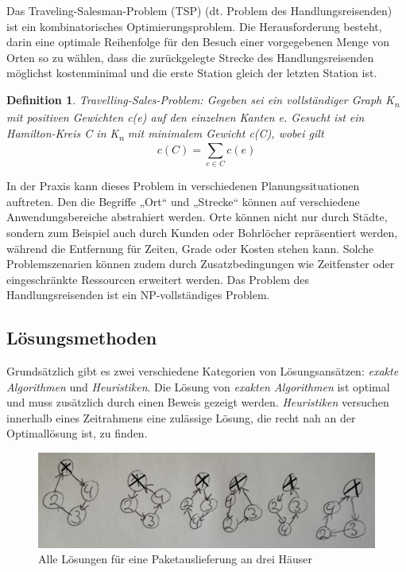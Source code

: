 \documentclass{article}
\newtheorem{mydef}{Definition}
\begin{document}
Das Traveling-Salesman-Problem (TSP) (dt. Problem des Handlungsreisenden) ist ein kombinatorisches Optimierungsproblem. Die Herausforderung besteht, darin eine optimale Reihenfolge für den Besuch einer vorgegebenen Menge von Orten so zu wählen, dass die zurückgelegte Strecke des Handlungsreisenden möglichst kostenminimal und die erste Station gleich der letzten Station ist.

\begin{mydef}
Travelling-Sales-Problem: Gegeben sei ein vollständiger Graph K\textsubscript{n} mit positiven Gewichten \textit{c(e)} auf den einzelnen Kanten  \textit{e}. Gesucht ist ein Hamilton-Kreis \textit{C} in K\textsubscript{n} mit minimalem Gewicht c(C), wobei gilt
\[c(C) =  \sum_{e \in C}  c(e) \]
\end{mydef}

In der Praxis kann dieses Problem in verschiedenen Planungssituationen auftreten. Den die Begriffe „Ort“ und „Strecke“ können auf verschiedene Anwendungsbereiche abstrahiert werden. Orte können nicht nur durch Städte, sondern zum Beispiel auch durch Kunden oder Bohrlöcher repräsentiert werden, während die Entfernung für Zeiten, Grade oder Kosten stehen kann. Solche Problemszenarien können zudem durch Zusatzbedingungen wie Zeitfenster oder eingeschränkte Ressourcen erweitert werden. Das Problem des Handlungsreisenden ist ein NP-vollständiges Problem.

\subsection{Lösungsmethoden}

Grundsätzlich gibt es zwei verschiedene Kategorien von Lösungsansätzen: \textit{exakte Algorithmen} und \textit{Heuristiken}. Die Lösung von \textit{exakten Algorithmen} ist optimal und muss zusätzlich durch einen Beweis gezeigt werden. \textit{Heuristiken} versuchen innerhalb eines Zeitrahmens eine zulässige Lösung, die recht nah an der Optimallösung ist, zu finden.

\begin{figure}[H]
	\centering
	\includegraphics[width=1\textwidth]{Graphen.png}
	\caption{Alle Lösungen für eine Paketauslieferung an drei Häuser}
	\label{fig:Rundreise}
\end{figure}
\end{document}
